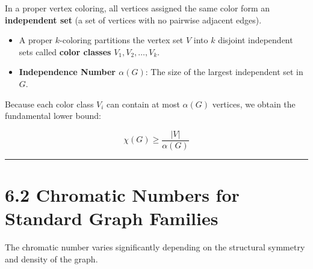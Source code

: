 \documentclass[
]{book}
\providecommand{\tightlist}{%
  \setlength{\itemsep}{0pt}\setlength{\parskip}{0pt}}
\theoremstyle{definition}
\theoremstyle{definition}
\theoremstyle{definition}
\theoremstyle{definition}
\theoremstyle{remark}
\begin{document}
In a proper vertex coloring, all vertices assigned the same color form an \textbf{independent set} (a set of vertices with no pairwise adjacent edges).

\begin{itemize}
\tightlist
\item
  A proper \(k\)-coloring partitions the vertex set \(V\) into \(k\) disjoint independent sets called \textbf{color classes} \(V_1, V_2, \dots, V_k\).
\item
  \textbf{Independence Number \(\alpha(G)\)}: The size of the largest independent set in \(G\).
\end{itemize}

Because each color class \(V_i\) can contain at most \(\alpha(G)\) vertices, we obtain the fundamental lower bound:

\[\chi(G) \ge \frac{\vert{}V\vert{}}{\alpha(G)}\]

\begin{center}\rule{0.5\linewidth}{0.5pt}\end{center}

\section{6.2 Chromatic Numbers for Standard Graph Families}\label{chromatic-numbers-for-standard-graph-families}

The chromatic number varies significantly depending on the structural symmetry and density of the graph.
\end{document}
